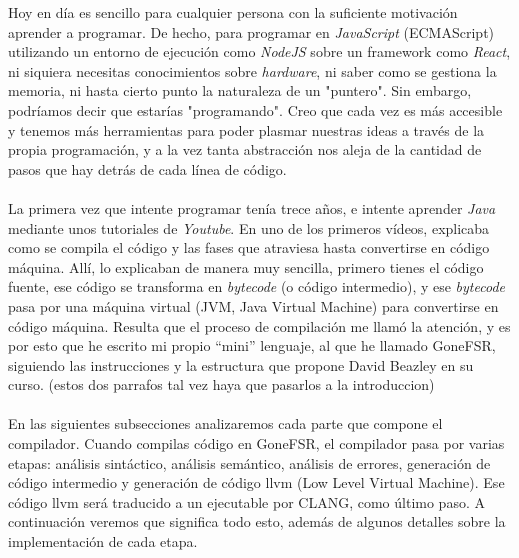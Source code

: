
Hoy en día es sencillo para cualquier persona con la suficiente motivación aprender a programar. De hecho, para programar en \textit{JavaScript} (ECMAScript) utilizando un entorno de ejecución como \textit{NodeJS} sobre un framework como \textit{React}, ni siquiera necesitas conocimientos sobre \textit{hardware}, ni saber como se gestiona la memoria, ni hasta cierto punto la naturaleza de un "puntero". Sin embargo, podríamos decir que estarías "programando". Creo que cada vez es más accesible y tenemos más herramientas para poder plasmar nuestras ideas a través de la propia programación, y a la vez tanta abstracción nos aleja de la cantidad de pasos que hay detrás de cada línea de código.\\\\
La primera vez que intente programar tenía trece años, e intente aprender \textit{Java} mediante unos tutoriales de \textit{Youtube}. En uno de los primeros vídeos, explicaba como se compila el código y las fases que atraviesa hasta convertirse en código máquina. Allí, lo explicaban de manera muy sencilla, primero tienes el código fuente, ese código se transforma en \textit{bytecode} (o código intermedio), y ese \textit{bytecode} pasa por una máquina virtual (JVM, Java Virtual Machine) para convertirse en código máquina. Resulta que el proceso de compilación me llamó la atención, y es por esto que he escrito mi propio ``mini''  lenguaje, al que he llamado GoneFSR, siguiendo las instrucciones y la estructura que propone David Beazley en su curso. (estos dos parrafos tal vez haya que pasarlos a la introduccion)\\\\
En las siguientes subsecciones analizaremos cada parte que compone el compilador. Cuando compilas código en GoneFSR, el compilador pasa por varias etapas: análisis sintáctico, análisis semántico, análisis de errores, generación de código intermedio y generación de código llvm (Low Level Virtual Machine). Ese código llvm será traducido a un ejecutable por CLANG, como último paso. A continuación veremos que significa todo esto, además de algunos detalles sobre la implementación de cada etapa.
